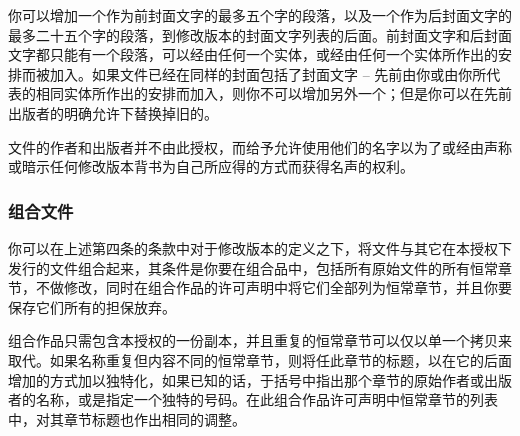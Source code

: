 你可以增加一个作为前封面文字的最多五个字的段落，以及一个作为后封面文字的最多二十五个字的段落，到修改版本的封面文字列表的后面。前封面文字和后封面文字都只能有一个段落，可以经由任何一个实体，或经由任何一个实体所作出的安排而被加入。如果文件已经在同样的封面包括了封面文字 -- 先前由你或由你所代表的相同实体所作出的安排而加入，则你不可以增加另外一个；但是你可以在先前出版者的明确允许下替换掉旧的。


文件的作者和出版者并不由此授权，而给予允许使用他们的名字以为了或经由声称或暗示任何修改版本背书为自己所应得的方式而获得名声的权利。

\subsubsection{组合文件}


你可以在上述第四条的条款中对于修改版本的定义之下，将文件与其它在本授权下发行的文件组合起来，其条件是你要在组合品中，包括所有原始文件的所有恒常章节，不做修改，同时在组合作品的许可声明中将它们全部列为恒常章节，并且你要保存它们所有的担保放弃。


组合作品只需包含本授权的一份副本，并且重复的恒常章节可以仅以单一个拷贝来取代。如果名称重复但内容不同的恒常章节，则将任此章节的标题，以在它的后面增加的方式加以独特化，如果已知的话，于括号中指出那个章节的原始作者或出版者的名称，或是指定一个独特的号码。在此组合作品许可声明中恒常章节的列表中，对其章节标题也作出相同的调整。

